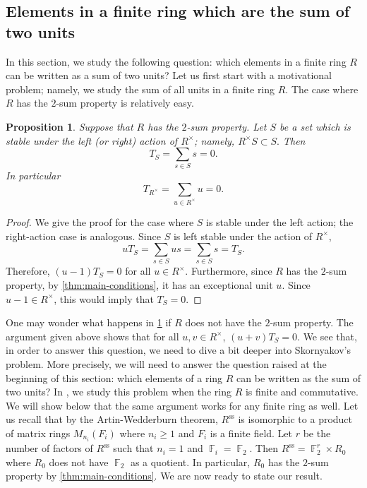 \documentclass[11pt, a4paper]{amsart}
\newtheorem{prop}[thm]{Proposition}
\theoremstyle{definition}
\DeclareMathOperator{\F}{\mathbb{F}}
\numberwithin{equation}{section}
\newcommand{\s}{\text{ss}}
\begin{document}
\subsection{Elements in a finite ring which are the sum of two units}
In this section, we study the following question: which elements in a finite ring $R$ can be written as a sum of two units? Let us first start with a motivational problem; namely, we study the sum of all units in a finite ring $R$. The case where $R$ has the $2$-sum property is relatively easy. 

\begin{prop} \label{prop:sum-units}
    Suppose that $R$ has the $2$-sum property. Let $S$ be a set which is stable under the left (or right) action of $R^{\times}$; namely, $R^{\times} S \subset S.$ Then 
    \[ T_{S} = \sum_{s \in S} s = 0.\]
    In particular 
    \[ T_{R^{\times}}=\sum_{u \in R^{\times}}u = 0.\]
\end{prop}
\begin{proof}

We give the proof for the case where \(S\) is stable under the left action; the right-action case is analogous.
    Since $S$ is left stable under the action of $R^{\times}$, 
    \[ uT_{S} = \sum_{s \in S} us = \sum_{s \in S} s= T_{S}. \] 
   Therefore, $(u-1) T_{S}=0$ for all $u \in R^{\times}.$ Furthermore, since $R$ has the $2$-sum property, by \cref{thm:main-conditions}, it has an exceptional unit $u.$ Since $u-1 \in R^{\times}$, this would imply that $T_{S}=0.$
\end{proof}

One may wonder what happens in \cref{prop:sum-units} if $R$ does not have the $2$-sum property. The argument given above shows that for all $u, v \in R^{\times}$, $(u+v)T_{S}=0$.   We see that, in order to answer this question,  we need to dive a bit deeper into Skornyakov's problem. More precisely, we will need to answer the question raised at the beginning of this section: which elements of a ring $R$ can be written as the sum of two units? In \cite{nguyengcd2026}, we study this problem when the ring $R$ is finite and commutative. We will show below that the same argument works for any finite ring as well. Let us recall that by the Artin-Wedderburn theorem, $R^{\s}$ is isomorphic to a product of matrix rings $M_{n_i}(F_i)$ where $n_i \geq 1$ and $F_i$ is a finite field. Let $r$ be the number of factors of $R^{\s}$ such that $n_i=1$ and $\F_i=\F_2.$ Then  $R^{\s} = \F_2^r \times R_0$ 
where $R_0$ does not have $\F_2$ as a quotient. In particular, $R_0$ has the $2$-sum property by \cref{thm:main-conditions}. We are now ready to state our result. 
\end{document}
